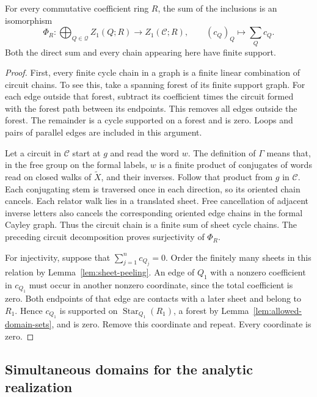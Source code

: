 \begin{lemma}
\label{lem:sheet-cycle-coordinates}
For every commutative coefficient ring $R$, the sum of the inclusions
is an isomorphism
\begin{equation}
 \Phi_R:\bigoplus_{Q\in\mathcal Q}Z_1(Q;R)
       \longrightarrow Z_1(\mathcal C;R),\qquad
       (c_Q)_Q\longmapsto\sum_Qc_Q.
 \label{eq:sheet-cycle-isomorphism}
\end{equation}
Both the direct sum and every chain appearing here have finite support.
\end{lemma}

\begin{proof}
First, every finite cycle chain in a graph is a finite linear
combination of circuit chains.  To see this, take a spanning forest
of its finite support graph.  For each edge outside that forest,
subtract its coefficient times the circuit formed with the forest
path between its endpoints.  This removes all edges outside the
forest.  The remainder is a cycle supported on a forest and is zero.
Loops and pairs of parallel edges are included in this argument.

Let a circuit in $\mathcal C$ start at $g$ and read the word $w$.
The definition of $\Gamma$ means that, in the free group on the
formal labels, $w$ is a finite product of conjugates of words read on
closed walks of $\widetilde X$, and their inverses.  Follow that
product from $g$ in $\mathcal C$.  Each conjugating stem is traversed
once in each direction, so its oriented chain cancels.  Each relator
walk lies in a translated sheet.  Free cancellation of adjacent
inverse letters also cancels the corresponding oriented edge chains
in the formal Cayley graph.  Thus the circuit chain is a finite sum
of sheet cycle chains.  The preceding circuit decomposition proves
surjectivity of $\Phi_R$.

For injectivity, suppose that $\sum_{j=1}^n c_{Q_j}=0$.  Order the
finitely many sheets in this relation by Lemma~\ref{lem:sheet-peeling}.
An edge of $Q_1$ with a nonzero coefficient in $c_{Q_1}$ must occur
in another nonzero coordinate, since the total coefficient is zero.
Both endpoints of that edge are contacts with a later sheet and
belong to $R_1$.  Hence $c_{Q_1}$ is supported on
$\operatorname{Star}_{Q_1}(R_1)$, a forest by
Lemma~\ref{lem:allowed-domain-sets}, and is zero.  Remove this
coordinate and repeat.  Every coordinate is zero.
\end{proof}

\subsection{Simultaneous domains for the analytic realization}

